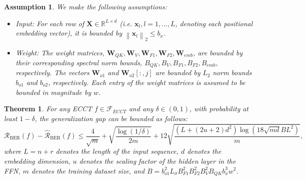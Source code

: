 \documentclass[lettersize,onecolumn]{IEEEtran}
\newtheorem{theorem}{Theorem}
\newtheorem{assumption}{Assumption}
\begin{document}
\begin{assumption}\label{assumption: bounded input and weight}
    We make the following assumptions:
    \begin{itemize}
        \item Input: For each row of $\mathbf{X} \in \mathbb{R}^{L \times d}$ (i.e. $\mathbf{x}_{l}, l=1,\ldots,L$, denoting each positional embedding vector), it is bounded by $\left\|\mathbf{x}_{l}\right\|_{2}\leq b_{x}$.
        \item Weight: The weight matrices, $\mathbf{W}_{QK}, \mathbf{W}_{V}, \mathbf{W}_{F1}, \mathbf{W}_{F2}, \mathbf{W}_{emb}$, are bounded by their corresponding spectral norm bounds, $B_{QK}, B_{V}, B_{F1}, B_{F2}, B_{emb}$, respectively. The vectors $\mathbf{W}_{o1}$ and $\mathbf{W}_{o2}[:,j]$ are bounded by $L_2$ norm bounds $b_{o1}$ and $ b_{o2}$, respectively. Each entry of the weight matrices is assumed to be bounded in magnitude by $w$.
    \end{itemize}
\end{assumption}

\begin{theorem}\label{theorem: bound for single-layer ecct (main result)}
    For any ECCT $f \in \mathcal{F}_{ECCT}$ and any $\delta \in (0,1)$, with probability at least $1-\delta$, the generalization gap can be bounded as follows:
    \begin{equation}
        \mathcal{R}_{\mathrm{BER}}(f)-\hat{\mathcal{R}}_{\mathrm{BER}}(f) \leq \frac{4}{\sqrt{m}}+\sqrt{\frac{\log (1 / \delta)}{2 m}}+12 \sqrt{\frac{(L+(2 u+2) d^{2}) \log (18 \sqrt{m d}B L^{2})}{m}},
    \end{equation}
    where $L=n+r$ denotes the length of the input sequence, $d$ denotes the embedding dimension, $u$ denotes the scaling factor of the hidden layer in the FFN, $m$ denotes the training dataset size, and $B=b_{o1}^{2} L_{\sigma} B_{F1}^{2} B_{F2}^{2} B_{V}^{2}B_{QK} b_{x}^{3}w^{2}$.
\end{theorem}
\end{document}
